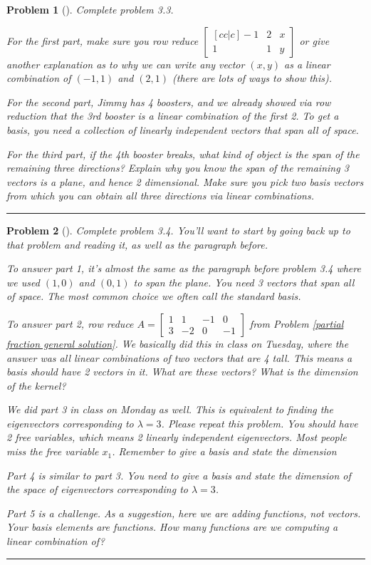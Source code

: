 \documentclass[letterpaper,oneside]{book}%
\theoremstyle{plain}
\theoremstyle{box}
\theoremstyle{problem}
\newtheorem{problemnum}{Problem}[chapter]
\newenvironment{problem}[1][]{\begin{problemnum}[#1]}{\end{problemnum}\nopagebreak\hrule\bigskip}
\newcommand{\bvec}[1]{\begin{bmatrix} #1 \end{bmatrix}}
\begin{document}
\begin{problem}
 Complete problem 3.3.  
 
 For the first part, make sure you row reduce $\bvec{[cc|c]-1&2&x\\1&1&y}$ or give another explanation as to why we can write any vector $(x,y)$ as a linear combination of $(-1,1)$ and $(2,1)$ (there are lots of ways to show this).
 
 For the second part, Jimmy has 4 boosters, and we already showed via row reduction that the 3rd booster is a linear combination of the first 2. To get a basis, you need a collection of linearly independent vectors that span all of space. 
 
 For the third part, if the 4th booster breaks, what kind of object is the span of the remaining three directions? Explain why you know the span of the remaining 3 vectors is a plane, and hence 2 dimensional.  Make sure you pick two basis vectors from which you can obtain all three directions via linear combinations.

 \end{problem}


\begin{problem}
 Complete problem 3.4.   You'll want to start by going back up to that problem and reading it, as well as the paragraph before.
 
 To answer part 1, it's almost the same as the paragraph before problem 3.4 where we used $(1,0)$ and $(0,1)$ to span the plane. You need 3 vectors that span all of space.  The most common choice we often call the standard basis. 
 
 To answer part 2, row reduce 
$A=\bvec{
1 & 1 & -1 & 0 \\
3 & -2 & 0 & -1
}$ from Problem \ref{partial fraction general solution}. We basically did this in class on Tuesday, where the answer was all linear combinations of two vectors that are 4 tall.  This means a basis should have 2 vectors in it.  What are these vectors? What is the dimension of the kernel?

 We did part 3 in class on Monday as well.  This is equivalent to finding the eigenvectors corresponding to $\lambda =3$.  Please repeat this problem. You should have 2 free variables, which means 2 linearly independent eigenvectors. Most people miss the free variable $x_1$. Remember to give a basis and state the dimension
 
 Part 4 is similar to part 3. You need to give a basis and state the dimension of the space of eigenvectors corresponding to $\lambda=3$. 
 
 Part 5 is a challenge.  As a suggestion, here we are adding functions, not vectors.  Your basis elements are functions. How many functions are we computing a linear combination of?

\end{problem}
\end{document}
